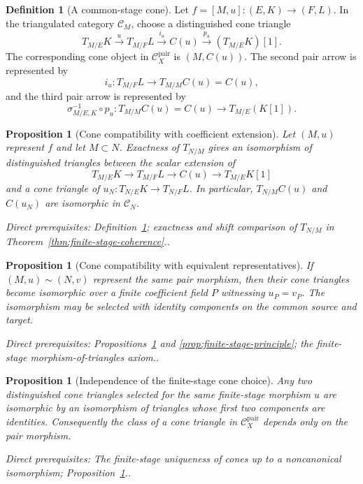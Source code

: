 \documentclass[10pt]{article}
\newtheorem{proposition}[theorem]{Proposition}
\theoremstyle{definition}
\newtheorem{definition}[theorem]{Definition}
\newcommand{\Pair}{\mathcal C_X^{\mathrm{pair}}}
\newcommand{\depends}[1]{\par\smallskip\noindent\textit{Direct prerequisites:} #1.}
\begin{document}
\begin{definition}[A common-stage cone]\label{def:pair-cone}
Let $f=[M,u]:(E,K)\to(F,L)$.  In the triangulated category $\mathcal C_M$,
choose a distinguished cone triangle
\[
 T_{M/E}K\xrightarrow{u}T_{M/F}L
 \xrightarrow{i_u}C(u)\xrightarrow{p_u}(T_{M/E}K)[1].
\]
The corresponding cone object in $\Pair$ is $(M,C(u))$.  The second pair
arrow is represented by
\[
 i_u:T_{M/F}L\longrightarrow T_{M/M}C(u)=C(u),
\]
and the third pair arrow is represented by
\[
 \sigma_{M/E,K}^{-1}\circ p_u:
 T_{M/M}C(u)=C(u)\longrightarrow T_{M/E}(K[1]).
\]
\end{definition}

\begin{proposition}[Cone compatibility with coefficient extension]
\label{prop:cone-extension}
Let $(M,u)$ represent $f$ and let $M\subset N$.  Exactness of $T_{N/M}$
gives an isomorphism of distinguished triangles between the scalar
extension of
\[
 T_{M/E}K\to T_{M/F}L\to C(u)\to T_{M/E}K[1]
\]
and a cone triangle of
$u_N:T_{N/E}K\to T_{N/F}L$.  In particular,
$T_{N/M}C(u)$ and $C(u_N)$ are isomorphic in $\mathcal C_N$.
\depends{Definition~\ref{def:pair-cone}; exactness and shift comparison of
$T_{N/M}$ in Theorem~\ref{thm:finite-stage-coherence}.}
\end{proposition}

\begin{proposition}[Cone compatibility with equivalent representatives]
\label{prop:cone-representatives}
If $(M,u)\sim(N,v)$ represent the same pair morphism, then their cone
triangles become isomorphic over a finite coefficient field $P$ witnessing
$u_P=v_P$.  The isomorphism may be selected with identity components on
the common source and target.
\depends{Propositions~\ref{prop:cone-extension} and
\ref{prop:finite-stage-principle}; the finite-stage morphism-of-triangles
axiom.}
\end{proposition}

\begin{proposition}[Independence of the finite-stage cone choice]
\label{prop:cone-choice}
Any two distinguished cone triangles selected for the same finite-stage
morphism $u$ are isomorphic by an isomorphism of triangles whose first two
components are identities.  Consequently the class of a cone triangle in
$\Pair$ depends only on the pair morphism.
\depends{The finite-stage uniqueness of cones up to a noncanonical
isomorphism; Proposition~\ref{prop:cone-representatives}.}
\end{proposition}
\end{document}
